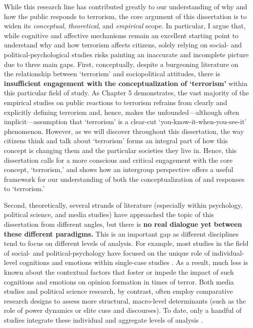 While this research line has contributed greatly to our understanding of why and how the public responds to terrorism, the core argument of this dissertation is to widen its \textit{conceptual}, \textit{theoretical}, and \textit{empirical} scope. In particular, I argue that, while cognitive and affective mechanisms remain an excellent starting point to understand why and how terrorism affects citizens, solely relying on social- and political-psychological studies risks painting an inaccurate and incomplete picture due to three main gaps. First, conceptually, despite a burgeoning literature on the relationship between `terrorism' and sociopolitical attitudes, there is \textbf{insufficient engagement with the conceptualization of `terrorism'} within this particular field of study. As Chapter 5 demonstrates, the vast majority of the empirical studies on public reactions to terrorism refrains from clearly and explicitly defining terrorism and, hence, makes the unfounded---although often implicit---assumption that `terrorism' is a clear-cut `you-know-it-when-you-see-it' phenomenon. However, as we will discover throughout this dissertation, the way citizens think and talk about `terrorism' forms an integral part of how this concept is changing them and the particular societies they live in. Hence, this dissertation calls for a more conscious and critical engagement with the core concept, `terrorism,' and shows how an intergroup perspective offers a useful framework for our understanding of both the conceptualization of and responses to `terrorism.'


Second, theoretically, several strands of literature (especially within psychology, political science, and media studies) have approached the topic of this dissertation from different angles, but there is \textbf{no real dialogue yet between these different paradigms.} This is an important gap as different disciplines tend to focus on different levels of analysis. For example, most studies in the field of social- and political-psychology have focused on the unique role of individual-level cognitions and emotions within single-case studies \citep[e.g.,][]{Huddy2005,Canetti-Nisim2009b, Vasilopoulos2019c}. As a result, much less is known about the contextual factors that foster or impede the impact of such cognitions and emotions on opinion formation in times of terror. Both media studies and political science research, by contrast, often employ comparative research designs to assess more structural, macro-level determinants (such as the role of power dynamics or elite cues and discourses). To date, only a handful of studies integrate these individual and aggregate levels of analysis \citep[e.g.,][]{Legewie2013, Nussio2019, Castanhosilva2018}.


